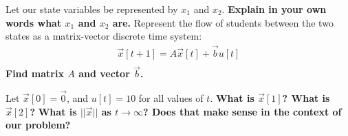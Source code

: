 \begin{enumerate}
    \qitem Let our state variables be represented by $x_1$ and $x_2$. \textbf{Explain in your own words what $x_1$ and $x_2$ are.}
    \qitem Represent the flow of students between the two states as a matrix-vector discrete time system:
    \begin{align*}
        \vec{x}[t+1] =  A\vec{x}[t] + \vec{b}u[t]\\
    \end{align*}
    \textbf{Find matrix $A$ and vector $\vec{b}$.} \\

    \qitem Let $\vec{x}[0] = \vec{0}$, and $u[t] = 10$ for all values of $t$. \textbf{What is $\vec{x}[1]$? What is $\vec{x}[2]$?} \textbf{What is $||\vec{x}||$ as $t\rightarrow\infty$? Does that make sense in the context of our problem?}
    

\end{enumerate}
